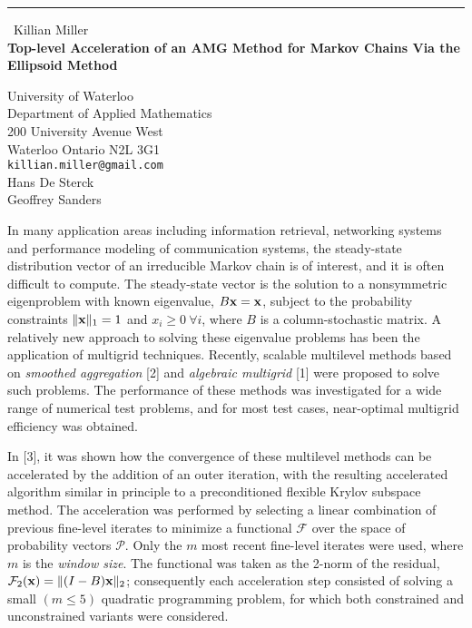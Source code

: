 \documentclass{report}
\begin{document}
\begin{center}
\rule{6in}{1pt} \
{\large Killian Miller \\
{\bf Top-level Acceleration of an AMG Method for Markov Chains Via the Ellipsoid Method}}

University of Waterloo \\ Department of Applied Mathematics \\ 200 University Avenue West \\ Waterloo Ontario N2L 3G1
\\
{\tt killian.miller@gmail.com}\\
Hans De Sterck\\
Geoffrey Sanders\end{center}

\newcommand{\mF}{\mathcal{F}}
\newcommand{\mP}{\mathcal{P}}
\newcommand{\mV}{\mathcal{V}}
\newcommand{\bx}{{\bf x}}

In many application areas including information retrieval, networking
systems and performance modeling of communication systems, the
steady-state distribution vector of an irreducible Markov chain is of
interest, and it is often difficult to compute. The steady-state vector
is the solution to a nonsymmetric eigenproblem with known eigenvalue,
$B\bx = \bx$, subject to the probability constraints $\|\bx\|_1 = 1$ and
$x_i \geq 0~\forall i$, where $B$ is a column-stochastic matrix. A
relatively new approach to solving these eigenvalue problems has been the
application of multigrid techniques. Recently, scalable multilevel
methods based on {\em smoothed aggregation} [2] and {\em algebraic
multigrid} [1] were proposed to solve such problems. The performance of
these methods was investigated for a wide range of numerical test
problems, and for most test cases, near-optimal multigrid efficiency was
obtained.

In [3], it was shown how the convergence of these multilevel methods can
be accelerated by the addition of an outer iteration, with the resulting
accelerated algorithm similar in principle to a preconditioned flexible
Krylov subspace method. The acceleration was performed by selecting a
linear combination of previous fine-level iterates to minimize a
functional $\mF$
over the space of probability vectors $\mP$. Only the $m$ most recent
fine-level iterates were used, where $m$ is the {\em window size}. The
functional was taken as the 2-norm of the residual, $\mF_2(\bx) =
\|(I-B)\bx\|_2$; consequently each acceleration step consisted of solving
a small $(m \leq 5)$ quadratic programming problem, for which both
constrained and unconstrained variants were considered.
\end{document}
